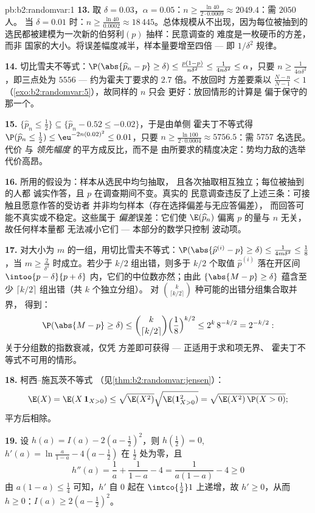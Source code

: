 \begin{solution}{pb:b2:randomvar:1}
\textbf{13.} 取 $\delta = 0.03$，$\alpha = 0.05$：$n \geq
\frac{\ln 40}{2\cdot0.0009} \approx 2049.4$：需 $2050$ 人。
当 $\delta = 0.01$ 时：$n \geq \frac{\ln40}{0.0002} \approx
18\,445$。总体规模从不出现，因为每位被抽到的
选民都被建模为一次新的伯努利$(p)$ 抽样：民意调查的
难度是一枚硬币的方差，而非
国家的大小。将误差幅度减半，样本量要增至四倍
--- 即 $1/\delta^2$ 规律。

\textbf{14.} 切比雪夫不等式：$\P(\abs{\widehat p_n - p} \geq
\delta) \leq \frac{p(1-p)}{n\delta^2} \leq
\frac1{4n\delta^2} \leq \alpha$，只要 $n \geq
\frac1{4\alpha\delta^2}$，即三点处为 $5556$ ---
约为霍夫丁要求的 $2.7$ 倍。不放回时
方差要乘以 $\frac{N -
n}{N-1} < 1$（\cref{exo:b2:randomvar:5}），故同样的 $n$ 只会
更好：放回情形的计算是
偏于保守的那一个。

\textbf{15.} $\{\widehat p_n \leq \frac12\} \subseteq
\{\widehat p_n - 0.52 \leq -0.02\}$，于是由单侧
霍夫丁不等式得 $\P(\widehat p_n \leq \tfrac12) \leq
\eu^{-2n(0.02)^2} \leq 0.01$，只要 $n \geq \frac{\ln
100}{2\cdot0.0004} \approx 5756.5$：需 $5757$ 名选民。代价
与 \emph{领先幅度} 的平方成反比，而不是
由所要求的精度决定：势均力敌的选举代价高昂。

\textbf{16.} 所用的假设为：样本从选民中均匀抽取，
且各次抽取相互独立；每位被抽到的人都
诚实作答，且 $p$ 在调查期间不变。真实的
民意调查违反了上述三条：可接触且愿意作答的受访者
并非均匀样本（存在选择偏差与无应答偏差），
而回答可能不真实或不稳定。这些属于
\emph{偏差}误差：它们使 $\E(\widehat p_n)$ 偏离
$p$ 的量与 $n$ 无关，故任何样本量都
无法减小它们 --- 本部分的数学只控制
波动项。

\textbf{17.} 对大小为 $m$ 的一组，用切比雪夫不等式：$\P(\abs{
\widehat p^{(i)} - p} \geq \delta) \leq \frac{1}{4m\delta^2}
\leq \frac18$，当 $m \geq \frac2{\delta^2}$ 时成立。若少于
$k/2$ 组出错，则多于 $k/2$ 个取值
$\widehat p^{(i)}$ 落在开区间 $\intoo{p -
\delta}{p + \delta}$ 内，它们的中位数亦然；由此
$\{\abs{M - p} \geq \delta\}$ 蕴含至少 $\lceil
k/2\rceil$ 组出错（共 $k$ 个独立分组）。
对 $\binom k{\lceil k/2\rceil}$ 种可能的出错分组集合取并界，
得到：
\[
\P(\abs{M - p} \geq \delta)
\leq \binom{k}{\lceil k/2\rceil}
\Bigl(\frac18\Bigr)^{k/2}
\leq 2^k\,8^{-k/2} = 2^{-k/2} :
\]
关于分组数的指数衰减，仅凭
方差即可获得 --- 正适用于求和项无界、
霍夫丁不等式不可用的情形。

\textbf{18.} 柯西–施瓦茨不等式
（见\cref{thm:b2:randomvar:jensen}）：
\[
\E(X) = \E(X\,\mathbf 1_{X>0})
\leq \sqrt{\E(X^2)}\sqrt{\E(\mathbf 1_{X>0}^2)}
= \sqrt{\E(X^2)\,\P(X > 0)} ;
\]
平方后相除。

\textbf{19.} 设 $h(a) = I(a) - 2(a - \tfrac12)^2$，则
$h(\tfrac12) = 0$, $h'(a) = \ln\frac a{1-a} - 4(a -
\tfrac12)$ 在 $\tfrac12$ 处为零，且
\[
h''(a) = \frac1a + \frac1{1-a} - 4 = \frac{1}{a(1-a)} - 4
\geq 0
\]
由 $a(1-a) \leq \frac14$ 可知，$h'$ 自 $0$ 起在
$\intco{\frac12}1$ 上递增，故 $h' \geq 0$，从而 $h \geq 0$：$I(a)
\geq 2(a - \tfrac12)^2$。


\end{solution}
